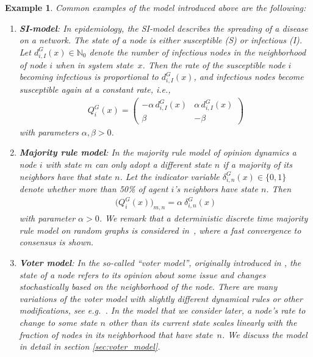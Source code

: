 \documentclass[a4paper,
               10pt,
               pdftex,
               normalheadings,
               headsepline,
               footsepline,
               headinclude,
               footinclude,
               DIV=14,
               abstracton]
{scrartcl}
\newtheorem{example}[theorem]{Example}
\begin{document}
\begin{example} \label{example:common_models}
Common examples of the model introduced above are the following:
\begin{enumerate}
    \item \textbf{SI-model}: In epidemiology, the SI-model \cite{Kiss2017} describes the spreading of a disease on a network. The state of a node is either susceptible (S) or infectious (I). Let $d_{i,I}^G(x) \in \mathbb{N}_0$ denote the number of infectious nodes in the neighborhood of node $i$ when in system state~$x$. Then the rate of the susceptible node $i$ becoming infectious is proportional to $d_{i,I}^G(x)$, and infectious nodes become susceptible again at a constant rate, i.e.,
    \begin{align}
    \label{eq:SIratematrix}
        Q_i^G(x) = \begin{pmatrix}
        - \alpha\, d_{i,I}^G(x) & \alpha\, d_{i,I}^G(x) \\
        \beta & - \beta
        \end{pmatrix}
    \end{align}
    with parameters $\alpha, \beta > 0$.
    
    \item \textbf{Majority rule model}: In the majority rule model of opinion dynamics \cite{Nguyen2020, Porter2016} a node $i$ with state $m$ can only adopt a different state $n$ if a majority of its neighbors have that state $n$. Let the indicator variable $\delta_{i,n}^G(x) \in \{0,1\}$ denote whether more than 50\% of agent $i$'s neighbors have state $n$. Then
    \begin{align}
        \Big(Q_i^G(x)\Big)_{m,n} = \alpha\ \delta_{i,n}^G(x)
    \end{align}
    with parameter $\alpha > 0$. We remark that a deterministic discrete time majority rule model on random graphs is considered in~\cite{sah2021majority}, where a fast convergence to consensus is shown.
    
\item \textbf{Voter model}: In the so-called ``voter model'', originally introduced in \cite{holley1975ergodic}, the state of a node refers to its opinion about some issue and changes stochastically based on the neighborhood of the node. There are many variations of the voter model with slightly different dynamical rules or other modifications, see e.g.~\cite{Moretti2013, Carro2016, Moreira2015, Khalil2018, Peralta2018, Vieira2020}.
In the model that we consider later, a node's rate to change to some state $n$ other than its current state scales linearly with the fraction of nodes in its neighborhood that have state~$n$. We discuss the model in detail in section \ref{sec:voter_model}.
\end{enumerate}
\end{example}
\end{document}
